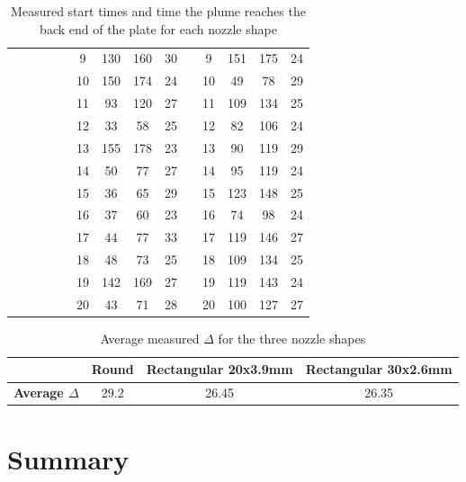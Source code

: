 \begin{table}[ht!]
\begin{adjustbox}{max width = 0.8\linewidth}
\begin{tabular}{lllll|c|c|c|c|l|c|c|c|c|}
 &  &  &  &  & 9 & 130 & 160 & 30 &  & 9 & 151 & 175 & 24 \\ \cline{6-9} \cline{11-14} 
 &  &  &  &  & 10 & 150 & 174 & 24 &  & 10 & 49 & 78 & 29 \\ \cline{6-9} \cline{11-14} 
 &  &  &  &  & 11 & 93 & 120 & 27 &  & 11 & 109 & 134 & 25 \\ \cline{6-9} \cline{11-14} 
 &  &  &  &  & 12 & 33 & 58 & 25 &  & 12 & 82 & 106 & 24 \\ \cline{6-9} \cline{11-14} 
 &  &  &  &  & 13 & 155 & 178 & 23 &  & 13 & 90 & 119 & 29 \\ \cline{6-9} \cline{11-14} 
 &  &  &  &  & 14 & 50 & 77 & 27 &  & 14 & 95 & 119 & 24 \\ \cline{6-9} \cline{11-14} 
 &  &  &  &  & 15 & 36 & 65 & 29 &  & 15 & 123 & 148 & 25 \\ \cline{6-9} \cline{11-14} 
 &  &  &  &  & 16 & 37 & 60 & 23 &  & 16 & 74 & 98 & 24 \\ \cline{6-9} \cline{11-14} 
 &  &  &  &  & 17 & 44 & 77 & 33 &  & 17 & 119 & 146 & 27 \\ \cline{6-9} \cline{11-14} 
 &  &  &  &  & 18 & 48 & 73 & 25 &  & 18 & 109 & 134 & 25 \\ \cline{6-9} \cline{11-14} 
 &  &  &  &  & 19 & 142 & 169 & 27 &  & 19 & 119 & 143 & 24 \\ \cline{6-9} \cline{11-14} 
 &  &  &  &  & 20 & 43 & 71 & 28 &  & 20 & 100 & 127 & 27 \\ \cline{6-9} \cline{11-14} 
\end{tabular}
\end{adjustbox}
\caption{Measured start times and time the plume reaches the back end of the plate for each nozzle shape}
\label{tab:traveltime}
\end{table}

\begin{table}[ht!]
\centering
\begin{adjustbox}{max width = 0.6\linewidth}
\begin{tabular}{|l|l|l|l|}
\hline
 & \textbf{Round} & \textbf{Rectangular 20x3.9mm} & \textbf{Rectangular 30x2.6mm} \\ \hline
\textbf{Average $\Delta$} & \multicolumn{1}{c|}{29.2} & \multicolumn{1}{c|}{26.45} & \multicolumn{1}{c|}{26.35} \\ \hline
\end{tabular}
\end{adjustbox}
\caption{Average measured $\Delta$ for the three nozzle shapes}
\label{tab:average_delta_traveltime}
\end{table}





\section{Summary}


